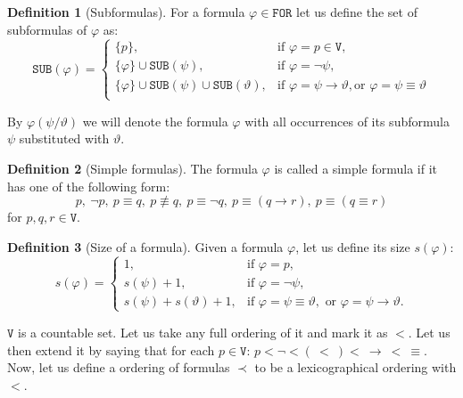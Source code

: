 \documentclass{article}
\theoremstyle{definition}
\newtheorem{definition}{Definition}[section]
\newcommand*{\id}{\equiv}
\newcommand*{\ra}{\rightarrow}
\newcommand*{\V}{\texttt{V}}
\newcommand*{\FOR}{\texttt{FOR}}
\newcommand*{\SUB}{\texttt{SUB}}
\begin{document}
\begin{definition}[Subformulas]
    For a formula $\varphi \in \FOR$ let us define the set of subformulas of $\varphi$ as:
    $$
        \SUB(\varphi) = \begin{cases}
            \{p\},                                            & \text{if } \varphi = p \in \V,                                                   \\
            \{\varphi\} \cup \SUB(\psi),                      & \text{if } \varphi = \lnot \psi,                                                 \\
            \{\varphi\} \cup \SUB(\psi) \cup \SUB(\vartheta), & \text{if } \varphi = \psi \ra \vartheta, \text{or } \varphi = \psi \id \vartheta \\
        \end{cases}
    $$
\end{definition}
By $\varphi(\psi / \vartheta)$ we will denote the formula $\varphi$ with all
occurrences of its subformula $\psi$ substituted with $\vartheta$.

\begin{definition}[Simple formulas]
    The formula $\varphi$ is called a simple formula if it has one of the following form:
    $$
        p,\ \lnot p,\ p \id q,\ p \not \id q,\ p \id \lnot q,\ p \id (q \ra r),\ p \id (q \id r)
    $$
    for $p, q, r \in \V$.
\end{definition}

\begin{definition}[Size of a formula]
    Given a formula $\varphi$, let us define its size $s(\varphi)$:
    $$
        s(\varphi) = \begin{cases}
            1,                          & \text{if } \varphi = p,                                                                      \\
            s(\psi) + 1,                & \text{if } \varphi = \lnot \psi,                                                             \\
            s(\psi) + s(\vartheta) + 1, & \text{if } \varphi = \psi \equiv \vartheta,\text{ or } \varphi = \psi \rightarrow \vartheta.
        \end{cases}
    $$
\end{definition}
$\V$ is a countable set. Let us take any full ordering of it and mark it as $<$. Let us then
extend it by saying that for each $p \in \V$: $p < \lnot <\xspace (\ < \ )\xspace<\ \ra\ <\ \id$. Now,
let us define a ordering of formulas $\prec$ to be a lexicographical ordering
with $<$.
\end{document}

